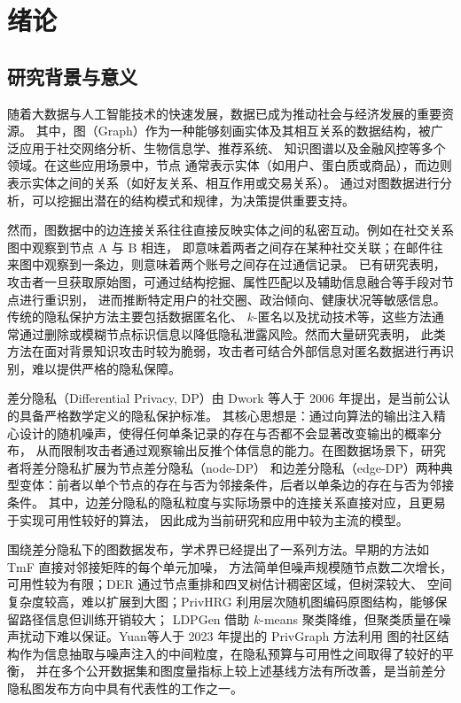 \clearpage

\section{绪论}

\subsection{研究背景与意义}

\par 随着大数据与人工智能技术的快速发展，数据已成为推动社会与经济发展的重要资源。
其中，图（Graph）作为一种能够刻画实体及其相互关系的数据结构，被广泛应用于社交网络分析、生物信息学、推荐系统、
知识图谱以及金融风控等多个领域\cite{hamilton_representation_2018}。在这些应用场景中，节点
通常表示实体（如用户、蛋白质或商品），而边则表示实体之间的关系（如好友关系、相互作用或交易关系）。
通过对图数据进行分析，可以挖掘出潜在的结构模式和规律，为决策提供重要支持。

\par 然而，图数据中的边连接关系往往直接反映实体之间的私密互动。例如在社交关系图中观察到节点 A 与 B 相连，
即意味着两者之间存在某种社交关联；在邮件往来图中观察到一条边，则意味着两个账号之间存在过通信记录。
已有研究表明，攻击者一旦获取原始图，可通过结构挖掘、属性匹配以及辅助信息融合等手段对节点进行重识别，
进而推断特定用户的社交圈、政治倾向、健康状况等敏感信息。传统的隐私保护方法主要包括数据匿名化、
$k$-匿名以及扰动技术等\cite{1018213520.nh,sweeney_k-anonymity_2002}，这些方法通常通过删除或模糊节点标识信息以降低隐私泄露风险。然而大量研究表明，
此类方法在面对背景知识攻击时较为脆弱，攻击者可结合外部信息对匿名数据进行再识别，难以提供严格的隐私保障\cite{narayanan_-anonymizing_2009,1018891994.nh}。

\par 差分隐私（Differential Privacy, DP）由 Dwork 等人于 2006 年提出，是当前公认的具备严格数学定义的隐私保护标准\cite{hutchison_differential_2006,dwork_algorithmic_2014}。
其核心思想是：通过向算法的输出注入精心设计的随机噪声，使得任何单条记录的存在与否都不会显著改变输出的概率分布，
从而限制攻击者通过观察输出反推个体信息的能力。在图数据场景下，研究者将差分隐私扩展为节点差分隐私（node-DP）
和边差分隐私（edge-DP）两种典型变体：前者以单个节点的存在与否为邻接条件，后者以单条边的存在与否为邻接条件。
其中，边差分隐私的隐私粒度与实际场景中的连接关系直接对应，且更易于实现可用性较好的算法，
因此成为当前研究和应用中较为主流的模型。

\par 围绕差分隐私下的图数据发布，学术界已经提出了一系列方法。早期的方法如 TmF 直接对邻接矩阵的每个单元加噪，
方法简单但噪声规模随节点数二次增长，可用性较为有限\cite{nguyen_differentially_2015}；DER 通过节点重排和四叉树估计稠密区域，但树深较大、
空间复杂度较高，难以扩展到大图\cite{chen_correlated_2014}；PrivHRG 利用层次随机图编码原图结构，能够保留路径信息但训练开销较大\cite{xiao_differentially_2014}；
LDPGen 借助 $k$-means 聚类降维，但聚类质量在噪声扰动下难以保证\cite{qin_generating_2017}。Yuan等人于 2023 年提出的 PrivGraph 方法利用
图的社区结构作为信息抽取与噪声注入的中间粒度，在隐私预算与可用性之间取得了较好的平衡，
并在多个公开数据集和图度量指标上较上述基线方法有所改善，是当前差分隐私图发布方向中具有代表性的工作之一\cite{yuan_privgraph_2023}。

